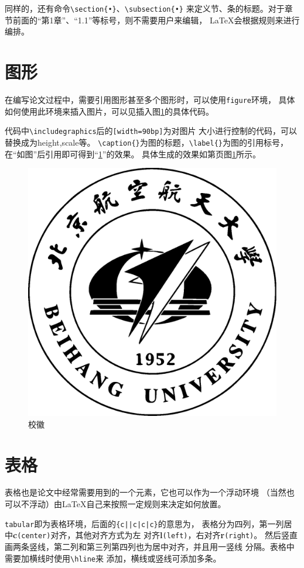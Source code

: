 同样的，还有命令\verb|\section{•}|、\verb|\subsection{•}|
来定义节、条的标题。对于章节前面的“第1章”、“1.1”等标号，则不需要用户来编辑，
\LaTeX{}会根据规则来进行编排。

\section{图形}
\label{sec-figure}
在编写论文过程中，需要引用图形甚至多个图形时，可以使用\texttt{figure}环境，
具体如何使用此环境来插入图片，可以见插入图\ref{sample-figbuaamark}的具体代码。

代码中\verb|\includegraphics|后的\verb|[width=90bp]|为对图片
大小进行控制的代码，可以替换成为height,scale等。
\verb|\caption{}|为图的标题，\verb|\label{}|为图的引用标号，
在“如图”后引用即可得到“\ref{sample-figbuaamark}”的效果。
具体生成的效果如第\pageref{sample-figbuaamark}页图\ref{sample-figbuaamark}所示。

\begin{figure}
\begin{center}
\includegraphics[width=90bp]{figure/buaamark.eps}
\caption{校徽}
\label{sample-figbuaamark}
\end{center}
\end{figure}

\section{表格}
\label{sec-table}
表格也是论文中经常需要用到的一个元素，它也可以作为一个浮动环境
（当然也可以不浮动）由\LaTeX{}自己来按照一定规则来决定如何放置。

\texttt{tabular}即为表格环境，后面的\verb+{c||c|c|c}+的意思为，
表格分为四列，第一列居中{\bf c}\texttt{(center)}对齐，其他对齐方式为左
对齐{\bf l}\texttt{(left)}，右对齐{\bf r}\texttt{(right)}。
然后竖直画两条竖线，第二列和第三列第四列也为居中对齐，并且用一竖线
分隔。表格中需要加横线时使用\verb|\hline|来
添加，横线或竖线可添加多条。

